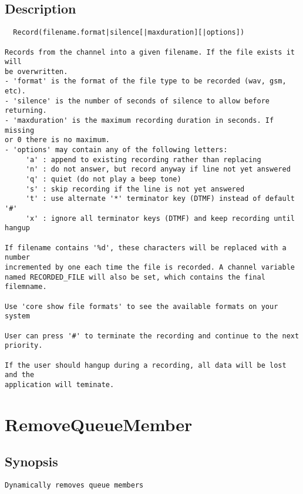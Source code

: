 \subsection{Description}
\begin{verbatim}
  Record(filename.format|silence[|maxduration][|options])

Records from the channel into a given filename. If the file exists it will
be overwritten.
- 'format' is the format of the file type to be recorded (wav, gsm, etc).
- 'silence' is the number of seconds of silence to allow before returning.
- 'maxduration' is the maximum recording duration in seconds. If missing
or 0 there is no maximum.
- 'options' may contain any of the following letters:
     'a' : append to existing recording rather than replacing
     'n' : do not answer, but record anyway if line not yet answered
     'q' : quiet (do not play a beep tone)
     's' : skip recording if the line is not yet answered
     't' : use alternate '*' terminator key (DTMF) instead of default '#'
     'x' : ignore all terminator keys (DTMF) and keep recording until hangup

If filename contains '%d', these characters will be replaced with a number
incremented by one each time the file is recorded. A channel variable
named RECORDED_FILE will also be set, which contains the final filemname.

Use 'core show file formats' to see the available formats on your system

User can press '#' to terminate the recording and continue to the next priority.

If the user should hangup during a recording, all data will be lost and the
application will teminate. 

\end{verbatim}


\section{RemoveQueueMember}
\subsection{Synopsis}
\begin{verbatim}
Dynamically removes queue members
\end{verbatim}
